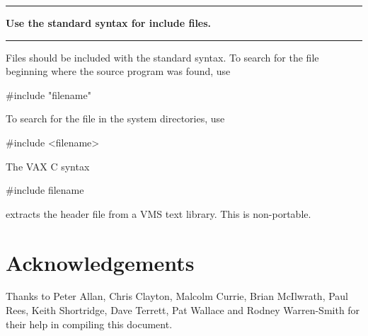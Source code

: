 \documentclass[twoside,11pt,nolof,noabs]{starlink}
\newcounter{sruleno}
\newcommand{\srule}[1]{
    \addtocounter{sruleno}{1}
    \goodbreak
    \rule{\textwidth}{0.3mm}
    \textbf{#1} \scpushright{\textbf{\thesruleno}}
    \rule{\textwidth}{0.1mm}
}
\begin{document}
\srule{Use the standard syntax for include files.}
Files should be included with the standard syntax.  To search for the file
beginning where the source program was found, use
\begin{terminalv}
      #include "filename"
\end{terminalv}

To search for the file in the system directories, use
\begin{terminalv}
      #include <filename>
\end{terminalv}

The VAX C syntax
\begin{terminalv}
      #include filename
\end{terminalv}
extracts the header file from a VMS text library. This is non-portable.


\section{Acknowledgements}

Thanks to Peter Allan, Chris Clayton, Malcolm Currie, Brian McIlwrath, Paul
Rees, Keith Shortridge, Dave Terrett, Pat Wallace and
Rodney Warren-Smith for their help in compiling this document.
\end{document}
